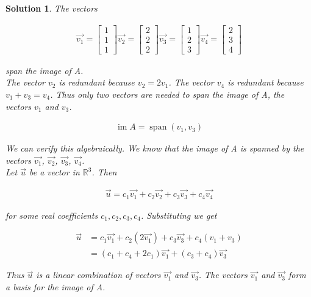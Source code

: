 \documentclass{article}
\newtheorem*{solution}{Solution}
\DeclareMathOperator{\Span}{span}
\DeclareMathOperator{\im}{im}
\begin{document}
\begin{solution}
The vectors 

\begin{align*}
\vec{v_{1}} = \begin{bmatrix} 1 \\ 1 \\ 1 \end{bmatrix} 
\vec{v_{2}} = \begin{bmatrix} 2 \\ 2 \\ 2 \end{bmatrix}
\vec{v_{3}} = \begin{bmatrix} 1 \\ 2 \\ 3 \end{bmatrix}
\vec{v_{4}} = \begin{bmatrix} 2 \\ 3 \\ 4 \end{bmatrix}
\end{align*}

span the image of A. \\

The vector $v_{2}$ is redundant because $v_{2} = 2v_{1}$. The vector $v_{4}$ is redundant because $v_{1} + v_{3} = v_{4}$. Thus only two vectors are needed to span the image of A, the vectors $v_{1}$ and $v_{3}$. 

\begin{align*}
\im A = \Span \left( v_{1}, v_{3} \right)
\end{align*}

We can verify this algebraically. We know that the image of A is spanned by the vectors $\vec{v_{1}}$, $\vec{v_{2}}$, $\vec{v_{3}}$, $\vec{v_{4}}$. \\

Let $\vec{u}$ be a vector in $\mathbb{R}^3$. Then

\begin{align*}
\vec{u} = c_{1} \vec{v_{1}} + c_{2} \vec{v_{2}} + c_{3} \vec{v_{3}} + c_{4} \vec{v_{4}}
\end{align*}

for some real coefficients $c_{1}, c_{2}, c_{3}, c_{4}$. Substituting we get 

\begin{align*}
\vec{u} &= c_{1} \vec{v_{1}} + c_{2} (2 \vec{v_{1}}) + c_{3} \vec{v_{3}} + c_{4} (v_{1} + v_{3}) \\
&= (c_{1} + c_{4} + 2c_{1}) \vec{v_{1}} + (c_{3} + c_{4}) \vec{v_{3}}
\end{align*}

Thus $\vec{u}$ is a linear combination of vectors $\vec{v_{1}}$ and $\vec{v_{3}}$. The vectors $\vec{v_{1}}$ and $\vec{v_{3}}$ form a basis for the image of A.

\end{solution}
\end{document}
